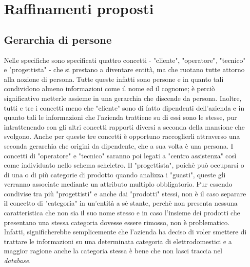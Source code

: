\documentclass[a4paper, 12pt]{report}
\begin{document}
\section{Raffinamenti proposti}

\subsection{Gerarchia di persone}

Nelle specifiche sono specificati quattro concetti - "cliente", "operatore", "tecnico" e "progettista" - che si prestano a diventare entità, ma
che ruotano tutte attorno alla nozione di persona. Tutte queste infatti sono persone e in quanto tali condividono almeno informazioni come il nome
ed il cognome; è perciò significativo metterle assieme in una gerarchia che discende da persona. Inoltre, tutti e tre i concetti meno che "cliente"
sono di fatto dipendenti dell'azienda e in quanto tali le informazioni che l'azienda trattiene su di essi sono le stesse, pur intrattenendo con gli
altri concetti rapporti diversi a seconda della mansione che svolgono. Anche per queste tre concetti è opportuno raccoglierli attraverso una seconda
gerarchia che origini da dipendente, che a sua volta è una persona. I concetti di "operatore" e "tecnico" saranno poi legati a "centro assistenza"
così come individuato nello schema scheletro. Il "progettista", poichè può occuparsi o di una o di più categorie di prodotto quando analizza i "guasti",
queste gli verranno associate mediante un attributo multiplo obbligatorio. Pur essendo condivise tra più "progettisti" e anche dai "prodotti" stessi,
non è il caso separare il concetto di "categoria" in un'entità a sè stante, perchè non presenta nessuna caratteristica che non sia il suo nome stesso
e in caso l'insieme dei prodotti che presentano una stessa categoria dovesse essere rimosso, non è problematico. Infatti, significherebbe semplicemente
che l'azienda ha deciso di voler smettere di trattare le informazioni su una determinata categoria di elettrodomestici e a maggior ragione anche la
categoria stessa è bene che non lasci traccia nel \textit{database}.
\end{document}
